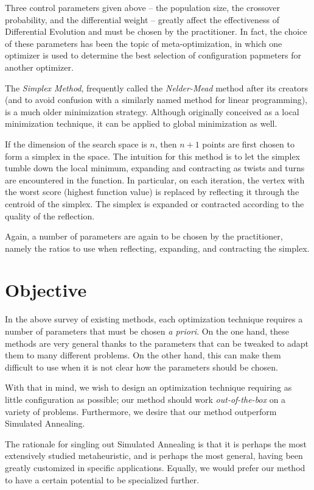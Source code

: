 \documentclass[12pt]{article}
\begin{document}
Three control parameters given above -- the population size, the crossover
probability, and the differential weight -- greatly affect the effectiveness of
Differential Evolution and must be chosen by the practitioner\cite{storn1997}.
In fact, the choice of these parameters has been the topic of
meta-optimization\cite{pedersen2010}, in which one optimizer is used to
determine the best selection of configuration papmeters for another optimizer.

The \emph{Simplex Method}\cite{nelder1965}, frequently called the
\emph{Nelder-Mead} method after its creators (and to avoid confusion with a
similarly named method for linear programming), is a much older
minimization strategy. Although originally conceived as a local
minimization technique, it can be applied to global minimization as well.

If the dimension of the search space is $n$, then $n+1$ points are first
chosen to form a simplex in the space. The intuition for this method is to
let the simplex tumble down the local minimum, expanding and contracting as
twists and turns are encountered in the function. In particular, on each
iteration, the vertex with the worst score (highest function value) is
replaced by reflecting it through the centroid of the simplex. The simplex
is expanded or contracted according to the quality of the reflection.

Again, a number of parameters are again to be chosen by the practitioner,
namely the ratios to use when reflecting, expanding, and contracting the
simplex.


\section{Objective}

In the above survey of existing methods, each optimization technique
requires a number of parameters that must be chosen \emph{a priori}. On the
one hand, these methods are very general thanks to the parameters that can
be tweaked to adapt them to many different problems. On the other hand,
this can make them difficult to use when it is not clear how the parameters
should be chosen.

With that in mind, we wish to design an optimization technique
requiring as little configuration as possible; our method should work
\emph{out-of-the-box} on a variety of problems. Furthermore, we desire
that our method outperform Simulated Annealing.

The rationale for singling out Simulated Annealing is that it is perhaps the
most extensively studied metaheuristic, and is perhaps the most general, having
been greatly customized in specific applications. Equally, we would prefer our
method to have a certain potential to be specialized further.
\end{document}
